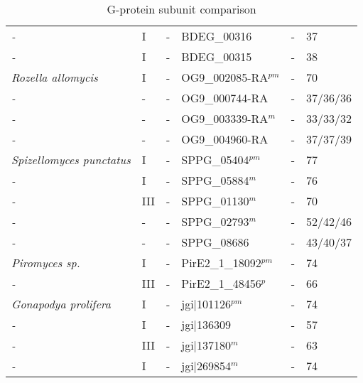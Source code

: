 \begin{table}[tbp]
\begin{tabular}{llllll}
  \emph{-} & I & - & BDEG\_00316 & - & 37 \\ 
  \emph{-} & I & - & BDEG\_00315 & - & 38 \\ 
  \emph{Rozella allomycis } & I & - & OG9\_002085-RA$^{pm}$ & - & 70 \\ 
  \emph{-} & - & - & OG9\_000744-RA & - & 37/36/36 \\ 
  \emph{-} & - & - & OG9\_003339-RA$^{m}$ & - & 33/33/32 \\ 
  \emph{-} & - & - & OG9\_004960-RA & - & 37/37/39 \\ 
  \emph{Spizellomyces punctatus } & I & - & SPPG\_05404$^{pm}$ & - & 77 \\ 
  \emph{-} & I & - & SPPG\_05884$^{m}$ & - & 76 \\ 
  \emph{-} & III & - & SPPG\_01130$^{m}$ & - & 70 \\ 
  \emph{-} & - & - & SPPG\_02793$^{m}$ & - & 52/42/46 \\ 
  \emph{-} & - & - & SPPG\_08686 & - & 43/40/37 \\ 
  \emph{Piromyces sp. } & I & - & PirE2\_1\_18092$^{pm}$ & - & 74 \\ 
  \emph{-} & III & - & PirE2\_1\_48456$^{p}$ & - & 66 \\ 
  \emph{Gonapodya prolifera } & I & - & jgi|101126$^{pm}$ & - & 74 \\ 
  \emph{-} & I & - & jgi|136309 & - & 57 \\ 
  \emph{-} & III & - & jgi|137180$^{m}$ & - & 63 \\ 
  \emph{-} & I & - & jgi|269854$^{m}$ & - & 74 \\ 
   \hline
\end{tabular}
\caption{G-protein subunit comparison} 
\label{tab:ChRhodAux_Gcomp}
\end{table}
